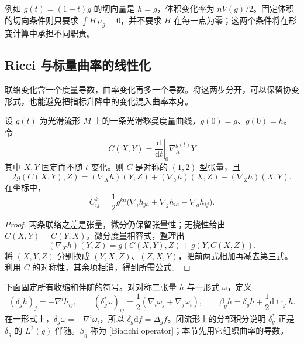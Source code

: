 例如 \(g(t)=(1+t)g\) 的切向量是 \(h=g\)，体积变化率为 \(nV(g)/2\)。固定体积的切向条件则只要求 \(\int H\,\mu_g=0\)，并不要求 \(H\) 在每一点为零；这两个条件将在形变计算中承担不同职责。

\subsection{Ricci 与标量曲率的线性化}
\label{g3:subsec:2501:02}
联络变化含一个度量导数，曲率变化再多一个导数。将这两步分开，可以保留协变形式，也能避免把指标升降中的变化混入曲率本身。

\begin{lemma}\label{g3:lem:levi-civita-variation}
	设 \(g(t)\) 为光滑流形 \(M\) 上的一条光滑黎曼度量曲线，\(g(0)=g\)、\(\dot g(0)=h\)。令
	\[
		C(X,Y)=\left.\frac{\mathrm d}{\mathrm dt}\right|_0\nabla^{g(t)}_XY
	\]
	其中 \(X,Y\) 固定而不随 \(t\) 变化。则 \(C\) 是对称的 \((1,2)\) 型张量，且
	\begin{equation}\label{g3:eq:connection-variation}
		2g(C(X,Y),Z)=(\nabla_Xh)(Y,Z)+(\nabla_Yh)(X,Z)-(\nabla_Zh)(X,Y).
	\end{equation}
	在坐标中，
	\[
		C^k_{ij}=\frac12g^{ka}\bigl(\nabla_i h_{ja}+\nabla_j h_{ia}-\nabla_a h_{ij}\bigr).
	\]
\end{lemma}
\begin{proof}
	两条联络之差是张量，微分仍保留张量性；无挠性给出 \(C(X,Y)=C(Y,X)\)。微分度量相容式，整理出
	\[
		(\nabla_Xh)(Y,Z)=g(C(X,Y),Z)+g(Y,C(X,Z)).
	\]
	将 \((X,Y,Z)\) 分别换成 \((Y,X,Z)\)、\((Z,X,Y)\)，把前两式相加再减去第三式。利用 \(C\) 的对称性，其余项相消，得到所需公式。
\end{proof}

下面固定所有收缩和伴随的符号。对对称二张量 \(h\) 与一形式 \(\omega\)，定义
\begin{equation}\label{g3:eq:divergence-bianchi-conventions}
	(\delta_g h)_j=-\nabla^i h_{ij},\qquad
	(\delta_g^*\omega)_{ij}=\frac12(\nabla_i\omega_j+\nabla_j\omega_i),\qquad
	\beta_g h=\delta_g h+\frac12\mathrm d\operatorname{tr}_g h.
\end{equation}
在一形式上，\(\delta_g\omega=-\nabla^i\omega_i\)，所以 \(\delta_g\mathrm df=\Delta_g f\)。闭流形上的分部积分说明 \(\delta_g^*\) 正是 \(\delta_g\) 的 \(L^2(g)\) 伴随。\(\beta_g\) 称为 [Bianchi operator]；本节先用它组织曲率的导数。

